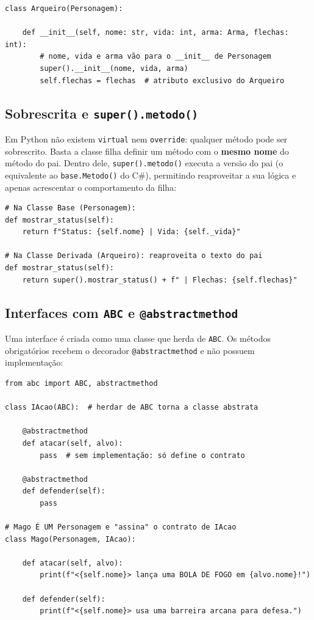 \begin{lstlisting}[style=python]
class Arqueiro(Personagem):

    def __init__(self, nome: str, vida: int, arma: Arma, flechas: int):
        # nome, vida e arma vão para o __init__ de Personagem
        super().__init__(nome, vida, arma)
        self.flechas = flechas  # atributo exclusivo do Arqueiro
\end{lstlisting}

\subsection{Sobrescrita e \texttt{super().metodo()}}

Em Python não existem \texttt{virtual} nem \texttt{override}: qualquer método pode ser
sobrescrito. Basta a classe filha definir um método com o \textbf{mesmo nome} do método do pai.
Dentro dele, \texttt{super().metodo()} executa a versão do pai (o equivalente ao
\texttt{base.Metodo()} do C\#), permitindo reaproveitar a sua lógica e apenas acrescentar o
comportamento da filha:

\begin{lstlisting}[style=python]
# Na Classe Base (Personagem):
def mostrar_status(self):
    return f"Status: {self.nome} | Vida: {self._vida}"

# Na Classe Derivada (Arqueiro): reaproveita o texto do pai
def mostrar_status(self):
    return super().mostrar_status() + f" | Flechas: {self.flechas}"
\end{lstlisting}

\subsection{Interfaces com \texttt{ABC} e \texttt{@abstractmethod}}

Uma interface é criada como uma classe que herda de \texttt{ABC}. Os métodos obrigatórios
recebem o decorador \texttt{@abstractmethod} e não possuem implementação:

\begin{lstlisting}[style=python]
from abc import ABC, abstractmethod

class IAcao(ABC):  # herdar de ABC torna a classe abstrata

    @abstractmethod
    def atacar(self, alvo):
        pass  # sem implementação: só define o contrato

    @abstractmethod
    def defender(self):
        pass

# Mago É UM Personagem e "assina" o contrato de IAcao
class Mago(Personagem, IAcao):

    def atacar(self, alvo):
        print(f"<{self.nome}> lança uma BOLA DE FOGO em {alvo.nome}!")

    def defender(self):
        print(f"<{self.nome}> usa uma barreira arcana para defesa.")
\end{lstlisting}

